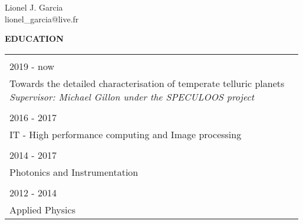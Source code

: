 \documentclass[8pt]{article}
\begin{document}
\begin{center}
    {\huge Lionel J. Garcia} \\
    \vspace{0.2cm}
    {lionel\_garcia@live.fr}
\end{center}

\newcommand{\block}[5]{
    \makecell[tr]{{\color{black!70}\textbf{#2}}\\{\color{black!50}#1}}& 
    \makecell[tl]{{\color{black!80}\textbf{#3}} {\color{black!40}#4} \\ \parbox[t]{10cm}{#5}}
}

\newcommand{\blocktitle}[2]{
    \makecell[tr]{{\color{black!70}\textbf{#2}}\\{\color{black!50}#1}}
}

\newcommand{\blockcontent}[3]{
    \makecell[tl]{{\color{black!80}\textbf{#1}} {\color{black!40}#2} \\ \parbox[t]{10cm}{#3}}
}

\newcommand{\blockhead}[1]{\begin{center}\color{black!80}\large\MakeUppercase{\textbf{#1}}\end{center}}

\newcommand{\indice}[1]{\color{black!40}\textit{#1}}

\newenvironment{blocks}
{\bgroup
\def\arraystretch{1.2}
\setstretch{1.3}
\small
\begin{tabular}{@{}p{4cm}r}}
{\end{tabular}
\egroup
\vspace{1cm}
} 

\vspace{1cm}


\blockhead{education}
\begin{blocks}
    \block{2019 - now}{PhD}{University of Liège}{Belgium}{Towards the detailed characterisation of temperate telluric planets \\ \indice{Supervisor: Michael Gillon under the SPECULOOS project}}\\
    \block{2016 - 2017}{MSc}{University of Bordeaux}{France}{IT - High performance computing and Image processing}\\
    \block{2014 - 2017}{MSc}{Institut d'Optique}{France}{Photonics and Instrumentation}\\
    \block{2012 - 2014}{Bs}{University of Paris-Sud}{France}{Applied Physics}\\
\end{blocks}
\end{document}
